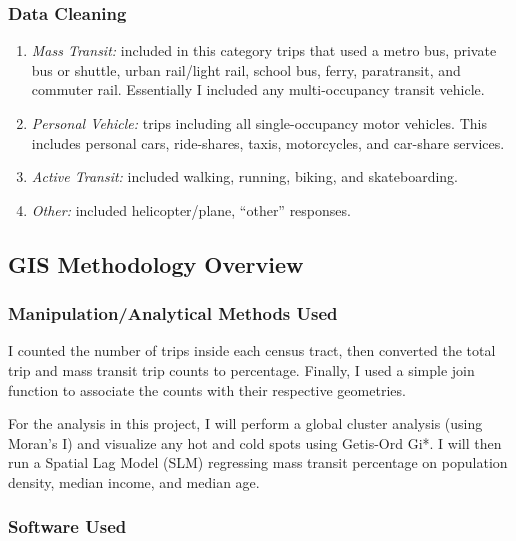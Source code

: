 \documentclass[
]{article}
\providecommand{\tightlist}{%
  \setlength{\itemsep}{0pt}\setlength{\parskip}{0pt}}
\begin{document}
\subsubsection{Data Cleaning}\label{data-cleaning}

\begin{enumerate}
\def\labelenumi{\arabic{enumi}.}
\tightlist
\item
  \emph{Mass Transit:} included in this category trips that used a metro
  bus, private bus or shuttle, urban rail/light rail, school bus, ferry,
  paratransit, and commuter rail. Essentially I included any
  multi-occupancy transit vehicle.
\item
  \emph{Personal Vehicle:} trips including all single-occupancy motor
  vehicles. This includes personal cars, ride-shares, taxis,
  motorcycles, and car-share services.
\item
  \emph{Active Transit:} included walking, running, biking, and
  skateboarding.
\item
  \emph{Other:} included helicopter/plane, ``other'' responses.
\end{enumerate}

\subsection{GIS Methodology Overview}\label{gis-methodology-overview}

\subsubsection{Manipulation/Analytical Methods
Used}\label{manipulationanalytical-methods-used}

I counted the number of trips inside each census tract, then converted
the total trip and mass transit trip counts to percentage. Finally, I
used a simple join function to associate the counts with their
respective geometries.

For the analysis in this project, I will perform a global cluster
analysis (using Moran's I) and visualize any hot and cold spots using
Getis-Ord Gi*. I will then run a Spatial Lag Model (SLM) regressing mass
transit percentage on population density, median income, and median age.

\subsubsection{Software Used}\label{software-used}
\end{document}
